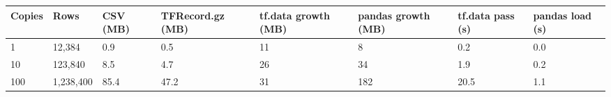 \begin{tabular}{R{1.2cm}R{1.8cm}R{1.4cm}R{2.1cm}R{1.7cm}R{1.7cm}R{1.6cm}R{1.6cm}}
\toprule
Copies & Rows & CSV (MB) & TFRecord.gz (MB) & tf.data growth (MB) & pandas growth (MB) & tf.data pass (s) & pandas load (s) \\
 & 12,384 & 0.9 & 0.5 & 11 & 8 & 0.2 & 0.0 \\
10 & 123,840 & 8.5 & 4.7 & 26 & 34 & 1.9 & 0.2 \\
100 & 1,238,400 & 85.4 & 47.2 & 31 & 182 & 20.5 & 1.1 \\
\bottomrule
\end{tabular}
